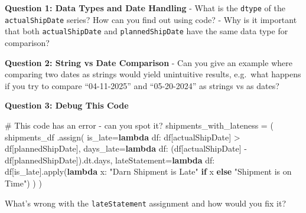 \documentclass[
  letterpaper,
  DIV=11,
  numbers=noendperiod]{scrartcl}
\newenvironment{Shaded}{\begin{snugshade}}{\end{snugshade}}
\newcommand{\BuiltInTok}[1]{\textcolor[rgb]{0.00,0.23,0.31}{#1}}
\newcommand{\CommentTok}[1]{\textcolor[rgb]{0.37,0.37,0.37}{#1}}
\newcommand{\ControlFlowTok}[1]{\textcolor[rgb]{0.00,0.23,0.31}{\textbf{#1}}}
\newcommand{\KeywordTok}[1]{\textcolor[rgb]{0.00,0.23,0.31}{\textbf{#1}}}
\newcommand{\NormalTok}[1]{\textcolor[rgb]{0.00,0.23,0.31}{#1}}
\newcommand{\OperatorTok}[1]{\textcolor[rgb]{0.37,0.37,0.37}{#1}}
\newcommand{\StringTok}[1]{\textcolor[rgb]{0.13,0.47,0.30}{#1}}
\begin{document}
\begin{tcolorbox}[enhanced jigsaw, toptitle=1mm, opacityback=0, colframe=quarto-callout-important-color-frame, leftrule=.75mm, arc=.35mm, opacitybacktitle=0.6, breakable, titlerule=0mm, coltitle=black, bottomtitle=1mm, title=\textcolor{quarto-callout-important-color}{\faExclamation}\hspace{0.5em}{🤔 Discussion Questions: Assign Mental Model}, colbacktitle=quarto-callout-important-color!10!white, rightrule=.15mm, left=2mm, bottomrule=.15mm, toprule=.15mm, colback=white]

\textbf{Question 1: Data Types and Date Handling} - What is the
\texttt{dtype} of the \texttt{actualShipDate} series? How can you find
out using code? - Why is it important that both \texttt{actualShipDate}
and \texttt{plannedShipDate} have the same data type for comparison?

\textbf{Question 2: String vs Date Comparison} - Can you give an example
where comparing two dates as strings would yield unintuitive results,
e.g.~what happens if you try to compare ``04-11-2025'' and
``05-20-2024'' as strings vs as dates?

\textbf{Question 3: Debug This Code}

\begin{Shaded}
\begin{Highlighting}[]
\CommentTok{\# This code has an error {-} can you spot it?}
\NormalTok{shipments\_with\_lateness }\OperatorTok{=}\NormalTok{ (}
\NormalTok{    shipments\_df}
\NormalTok{    .assign(}
\NormalTok{        is\_late}\OperatorTok{=}\KeywordTok{lambda}\NormalTok{ df: df[}\StringTok{\textquotesingle{}actualShipDate\textquotesingle{}}\NormalTok{] }\OperatorTok{\textgreater{}}\NormalTok{ df[}\StringTok{\textquotesingle{}plannedShipDate\textquotesingle{}}\NormalTok{],}
\NormalTok{        days\_late}\OperatorTok{=}\KeywordTok{lambda}\NormalTok{ df: (df[}\StringTok{\textquotesingle{}actualShipDate\textquotesingle{}}\NormalTok{] }\OperatorTok{{-}}\NormalTok{ df[}\StringTok{\textquotesingle{}plannedShipDate\textquotesingle{}}\NormalTok{]).dt.days,}
\NormalTok{        lateStatement}\OperatorTok{=}\KeywordTok{lambda}\NormalTok{ df: df[}\StringTok{\textquotesingle{}is\_late\textquotesingle{}}\NormalTok{].}\BuiltInTok{apply}\NormalTok{(}\KeywordTok{lambda}\NormalTok{ x: }\StringTok{"Darn Shipment is Late"} \ControlFlowTok{if}\NormalTok{ x }\ControlFlowTok{else} \StringTok{"Shipment is on Time"}\NormalTok{)}
\NormalTok{    )}
\NormalTok{)}
\end{Highlighting}
\end{Shaded}

What's wrong with the \texttt{lateStatement} assignment and how would
you fix it?

\end{tcolorbox}
\end{document}
